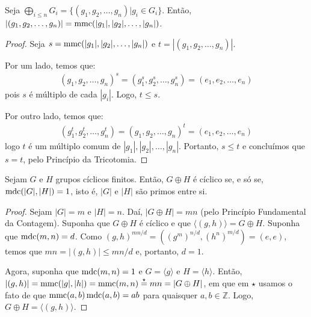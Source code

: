 	
	\begin{theorem}
		\label{ordem}
		Seja $\displaystyle{\bigoplus_{i \leq n}}G_i = \{(g_1, g_2, \dots , g_n)| g_i\in G_i \}$. Então, 
		$|(g_1, g_2, \dots , g_n)| = \operatorname{mmc}(|g_1|, |g_2|, \dots , |g_n|)$.
	\end{theorem}
	
	\begin{proof}
		Seja $s = \operatorname{mmc}(|g_1|, |g_2|, \dots , |g_n|)$ e $t = |(g_1, g_2, \dots , g_n)|$. 
		\par\vspace{0.3cm} Por um lado, temos que:
		\begin{align*}
		(g_1, g_2, \dots , g_n)^s = (g_1^s, g_2^s, \dots , g_n^s) = (e_1, e_2, \dots , e_n)
		\end{align*}
		pois $s$ é múltiplo de cada $|g_i|$. Logo, $t\leq s$.
		\par\vspace{0.3cm} Por outro lado, temos que:
		\begin{align*}
		(g_1^t, g_2^t, \dots , g_n^t) = (g_1, g_2, \dots , g_n)^t = (e_1, e_2, \dots , e_n)
		\end{align*}
		logo $t$ é um múltiplo comum de $|g_1|, |g_2|, \dots , |g_n|$. Portanto, $s\leq t$ e concluímos que $s = t$, pelo Princípio da Tricotomia. 
		
	\end{proof}
	
	
	\begin{theorem}
		\label{crit}
		Sejam $G$ e $H$ grupos cíclicos finitos. Então, $G\oplus H$ é cíclico se, e só se, $\operatorname{mdc}(|G|, |H|) = 1$, isto é, $|G|$ e $|H|$ são primos entre si.
	\end{theorem}
	
	\begin{proof}
		Sejam $|G| = m$ e $|H| = n$. Daí, $|G\oplus H| = mn$ (pelo Princípio Fundamental da Contagem). Suponha que $G\oplus H$ é cíclico e que $\langle (g, h) \rangle = G\oplus H$. Suponha que $\operatorname{mdc}(m,n) = d$. Como $(g, h)^{mn/d} = ((g^m)^{n/d} , (h^n)^{m/d}) = (e,e)$, temos que $mn = |(g, h)| \leq mn/d$ e, portanto, $d = 1$.
		
		\par\vspace{0.3cm} Agora, suponha que $\operatorname{mdc}(m, n) = 1$ e $G = \langle g  \rangle $ e $H = \langle h \rangle$. Então, $|(g,h)| = \operatorname{mmc}(|g|, |h|) = \operatorname{mmc}(m, n) \overset{\star}{=} mn = |G\oplus H|$, em que em $\star$ usamos o fato de que $\operatorname{mmc}(a,b)\operatorname{mdc}(a,b) = ab$ para quaisquer $a,b\in\mathbb{Z}$.
		Logo, $G\oplus H = \langle (g, h) \rangle$. 
	\end{proof}
	
